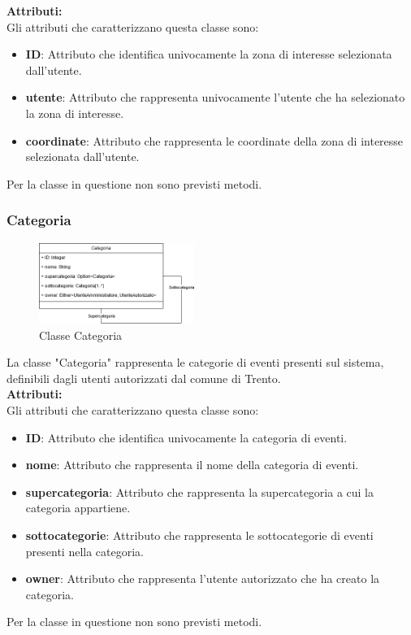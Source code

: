 \documentclass{article}
\begin{document}
\textbf{Attributi:}\\
Gli attributi che caratterizzano questa classe sono:
\begin{itemize}
    \item \textbf{ID}: Attributo che identifica univocamente la zona di interesse selezionata dall'utente.
    \item \textbf{utente}: Attributo che rappresenta univocamente l'utente che ha selezionato la zona di interesse.
    \item \textbf{coordinate}: Attributo che rappresenta le coordinate della zona di interesse selezionata dall'utente.\\
\end{itemize}
Per la classe in questione non sono previsti metodi.

\subsubsection{Categoria}

\begin{figure}[htbp]
    \centering
    \includegraphics[width=0.45\textwidth]{Images/categoria_class.png}
    \caption{Classe Categoria}
    \label{fig:categoria}
\end{figure}

La classe "Categoria" rappresenta le categorie di eventi presenti sul sistema, definibili dagli utenti autorizzati dal comune di Trento.\\

\textbf{Attributi:}\\
Gli attributi che caratterizzano questa classe sono:
\begin{itemize}
    \item \textbf{ID}: Attributo che identifica univocamente la categoria di eventi.
    \item \textbf{nome}: Attributo che rappresenta il nome della categoria di eventi.
    \item \textbf{supercategoria}: Attributo che rappresenta la supercategoria a cui la categoria appartiene.
    \item \textbf{sottocategorie}: Attributo che rappresenta le sottocategorie di eventi presenti nella categoria.
    \item \textbf{owner}: Attributo che rappresenta l'utente autorizzato che ha creato la categoria.\\
\end{itemize}
Per la classe in questione non sono previsti metodi.
\end{document}
